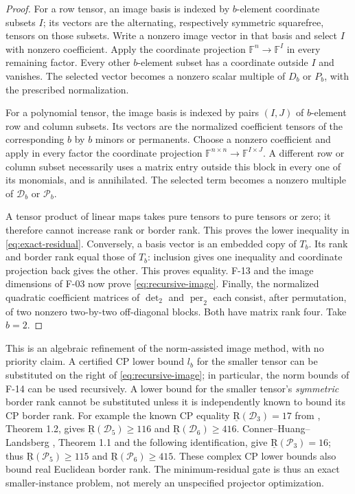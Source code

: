 \documentclass[11pt]{article}
\newcommand{\F}{\mathbb F}
\newcommand{\BR}{\underline{\mathrm R}}\newcommand{\TR}{\mathrm R}
\begin{document}
\begin{proof}
For a row tensor, an image basis is indexed by $b$-element
coordinate subsets $I$; its vectors are the alternating,
respectively symmetric squarefree, tensors on those subsets.
Write a nonzero image vector in that basis and select $I$
with nonzero coefficient. Apply the coordinate projection
$\F^n\to\F^I$ in every remaining factor. Every other
$b$-element subset has a coordinate outside $I$ and vanishes.
The selected vector becomes a nonzero scalar multiple of $D_b$
or $P_b$, with the prescribed normalization.

For a polynomial tensor, the image basis is indexed by pairs
$(I,J)$ of $b$-element row and column subsets. Its vectors
are the normalized coefficient tensors of the corresponding
$b$ by $b$ minors or permanents. Choose a nonzero coefficient
and apply in every factor the coordinate projection
$\F^{n\times n}\to\F^{I\times J}$. A different row or column
subset necessarily uses a matrix entry outside this block
in every one of its monomials, and is annihilated. The
selected term becomes a nonzero multiple of $\mathcal D_b$
or $\mathcal P_b$.

A tensor product of linear maps takes pure tensors to pure
tensors or zero; it therefore cannot increase rank or border
rank. This proves the lower inequality in
\eqref{eq:exact-residual}. Conversely, a basis vector is an
embedded copy of $T_b$. Its rank and border rank equal those
of $T_b$: inclusion gives one inequality and coordinate
projection back gives the other. This proves equality.
F-13 and the image dimensions of F-03 now prove
\eqref{eq:recursive-image}. Finally, the normalized quadratic
coefficient matrices of $\det_2$ and $\operatorname{per}_2$
each consist, after permutation, of two nonzero two-by-two
off-diagonal blocks. Both have matrix rank four. Take $b=2$.
\end{proof}
This is an algebraic refinement of the norm-assisted image
method, with no priority claim. A certified CP lower bound
$l_b$ for the smaller tensor can be substituted on the right
of \eqref{eq:recursive-image}; in particular, the norm bounds
of F-14 can be used recursively. A lower bound for the smaller
tensor's \emph{symmetric} border rank cannot be substituted
unless it is independently known to bound its CP border rank.
For example the known CP equality
$\BR(\mathcal D_3)=17$ from \cite{CHL}, Theorem 1.2,
gives $\BR(\mathcal D_5)\geq116$ and
$\BR(\mathcal D_6)\geq416$.
Conner--Huang--Landsberg \cite{CHuangL}, Theorem 1.1 and
the following identification, give $\BR(\mathcal P_3)=16$;
thus $\BR(\mathcal P_5)\geq115$ and
$\BR(\mathcal P_6)\geq415$.
These complex CP lower bounds also bound real Euclidean
border rank. The minimum-residual gate is thus
an exact smaller-instance problem, not merely an unspecified
projector optimization.
\end{document}

